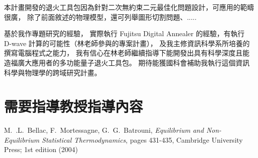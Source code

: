 \documentclass[12pt]{article}
\begin{document}
本計畫開發的退火工具包因為針對二次無約束二元最佳化問題設計，可應用的範疇很廣，
除了前面敘述的物理模型，還可列舉圖形切割問題、.....

基於我作專題研究的經驗，
實際執行 Fujitsu Digital Annealer 的經驗，有執行 D-wave 計算的可能性（林老師參與的專案計畫），
及我主修資訊科學系所培養的撰寫電腦程式之能力，
我有信心在林老師繼續指導下能開發出具有科學深度且能造福廣大應用者的多功能量子退火工具包。
期待能獲國科會補助我執行這個資訊科學與物理學的跨域研究計畫。

\section*{需要指導教授指導內容}


\begin{thebibliography}{99}
M.~.L.~Bellac, F.~Mortessagne, G.~G.~Batrouni, {\it Equilibrium and Non-Equilibrium Statistical Thermodynamics},
pages 431-435, Cambridge University Press; 1st edition (2004)
\end{thebibliography}
\end{document}
